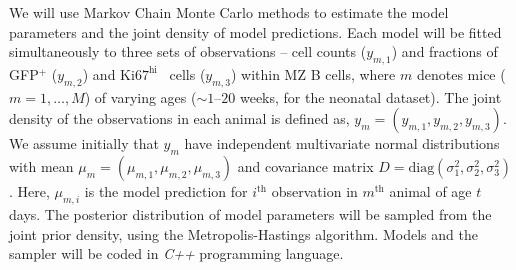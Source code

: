 \documentclass[11pt]{article}
\newcommand{\khi}{\ensuremath{\text{Ki67}^\text{hi}}~}
\begin{document}
We will use  Markov Chain Monte Carlo methods to estimate the model parameters and the joint density of model predictions. %
Each model will be fitted simultaneously to three sets of observations -- cell counts ($y_{m,1}$) and fractions of {GFP$^+$} ($y_{m,2}$) and {\khi} cells ($y_{m,3}$) within MZ B cells, where $m$ denotes mice ($m = 1,\ldots,M$) of varying ages ($\sim1\text{--}20$ weeks, for the neonatal dataset).
The joint density of the observations in each animal is defined as, $y_{m}=(y_{m,1}, y_{m,2}, y_{m,3})$.
We assume initially that $y_{m}$ have independent multivariate normal distributions with mean $\mu_{m}=(\mu_{m,1}, \mu_{m,2}, \mu_{m,3})$ and covariance matrix $D = \text{diag}(\sigma_{1}^{2}, \sigma_{2}^{2}, \sigma_{3}^{2})$.
Here, $\mu_{m, i}$ is the model prediction for  $i^{\text{th}}$ observation in $m^{\text{th}}$ animal of age $t$ days.
The posterior distribution of model parameters will be sampled from the joint prior density, using the Metropolis-Hastings algorithm. %
Models and the sampler will be coded in \textit{C++} programming language. %
\end{document}
